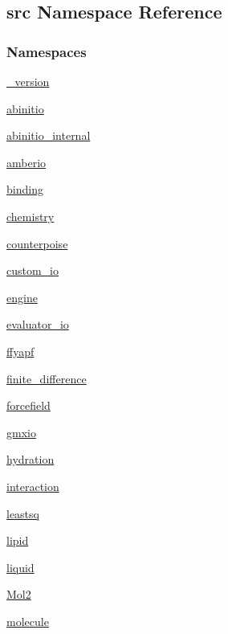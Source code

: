 \hypertarget{namespacesrc}{}\subsection{src Namespace Reference}
\label{namespacesrc}
\subsubsection*{Namespaces}
\begin{DoxyCompactItemize}
\item 
 \hyperlink{namespacesrc_1_1__version}{\+\_\+version}
\item 
 \hyperlink{namespacesrc_1_1abinitio}{abinitio}
\item 
 \hyperlink{namespacesrc_1_1abinitio__internal}{abinitio\+\_\+internal}
\item 
 \hyperlink{namespacesrc_1_1amberio}{amberio}
\item 
 \hyperlink{namespacesrc_1_1binding}{binding}
\item 
 \hyperlink{namespacesrc_1_1chemistry}{chemistry}
\item 
 \hyperlink{namespacesrc_1_1counterpoise}{counterpoise}
\item 
 \hyperlink{namespacesrc_1_1custom__io}{custom\+\_\+io}
\item 
 \hyperlink{namespacesrc_1_1engine}{engine}
\item 
 \hyperlink{namespacesrc_1_1evaluator__io}{evaluator\+\_\+io}
\item 
 \hyperlink{namespacesrc_1_1ffyapf}{ffyapf}
\item 
 \hyperlink{namespacesrc_1_1finite__difference}{finite\+\_\+difference}
\item 
 \hyperlink{namespacesrc_1_1forcefield}{forcefield}
\item 
 \hyperlink{namespacesrc_1_1gmxio}{gmxio}
\item 
 \hyperlink{namespacesrc_1_1hydration}{hydration}
\item 
 \hyperlink{namespacesrc_1_1interaction}{interaction}
\item 
 \hyperlink{namespacesrc_1_1leastsq}{leastsq}
\item 
 \hyperlink{namespacesrc_1_1lipid}{lipid}
\item 
 \hyperlink{namespacesrc_1_1liquid}{liquid}
\item 
 \hyperlink{namespacesrc_1_1Mol2}{Mol2}
\item 
 \hyperlink{namespacesrc_1_1molecule}{molecule}
\item 

\end{DoxyCompactItemize}
